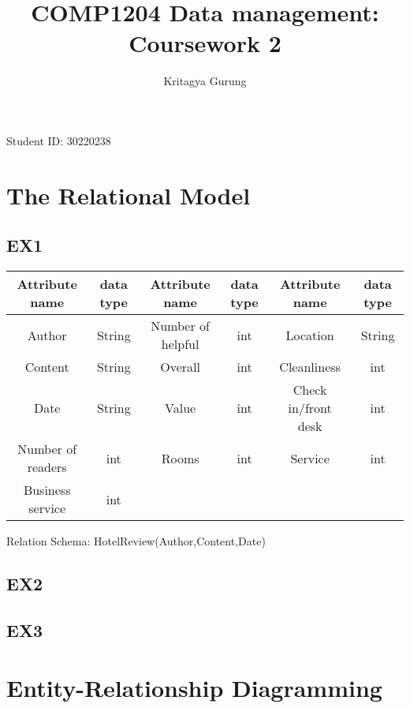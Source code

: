 \documentclass{article}
\title{COMP1204 Data management: Coursework 2}
\author{Kritagya Gurung}
\begin{document}
	
	\maketitle
	\begin{center}
		Student ID: 30220238
	\end{center}
	
	\newpage

	\section{The Relational Model}

	\subsection{EX1}
	
	\begin{center}
		\begin{tabular}{||c c | c c | c c ||} 
			\hline
			Attribute name & data type & Attribute name & data type & Attribute name & data type \\
			\hline
			Author & String & Number of helpful & int & Location & String \\ 
			Content & String & Overall & int & Cleanliness & int \\ 
			Date & String & Value & int & Check in/front desk & int \\ 
			Number of readers & int & Rooms & int & Service & int \\
			Business service & int \\
			\hline
		
		\end{tabular}
	\end{center}
	Relation Schema: 
	\newline
	HotelReview(Author,Content,Date)
	
	\subsection{EX2}
	
	\subsection{EX3}
	
	\section{Entity-Relationship Diagramming}
	
\end{document}
